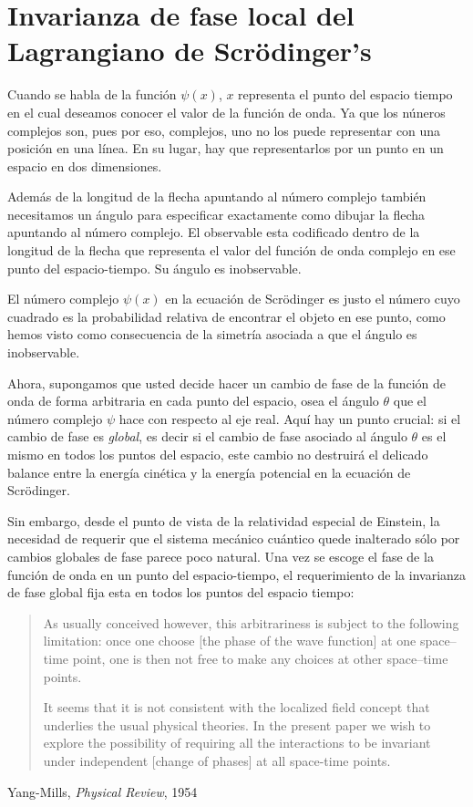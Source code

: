 \section{Invarianza de fase local del Lagrangiano de  Scrödinger's}

Cuando se habla de la función $\psi(x)$, $x$ representa el punto del espacio tiempo en el cual deseamos conocer el valor de la función de onda. 
Ya que los núneros complejos son, pues por eso, complejos, uno no los puede representar con una posición en una línea. En su lugar, hay que representarlos por un punto en un espacio en dos dimensiones.

Además de la longitud de la flecha apuntando al número complejo también necesitamos un ángulo para especificar exactamente como dibujar la flecha apuntando al número complejo. El observable esta codificado dentro de la longitud de la flecha que representa el valor del función de onda complejo en ese punto del espacio-tiempo. Su ángulo es inobservable.

El número complejo $\psi(x)$  en la ecuación de Scrödinger es justo el número cuyo cuadrado es la probabilidad relativa de encontrar el objeto en ese punto, como hemos visto como consecuencia de la simetría asociada a que el ángulo es inobservable.

Ahora, supongamos que usted decide hacer un cambio de fase de la función de onda de forma arbitraria en cada punto del espacio, osea el ángulo $\theta$ que el número complejo $\psi$ hace con respecto al eje real. Aquí hay un punto crucial: si el cambio de fase es \emph{global}, es decir si el cambio de fase asociado al ángulo $\theta$ es el mismo en todos los puntos del espacio, este cambio no destruirá el delicado balance entre la energía cinética y la energía potencial en la ecuación de Scrödinger.

Sin embargo, desde el punto de vista de la relatividad especial de Einstein, la necesidad de requerir que el sistema mecánico cuántico quede inalterado sólo por cambios globales de fase parece poco natural. Una vez se escoge el fase de la función de onda en un punto del espacio-tiempo, el requerimiento de la invarianza de fase global fija esta en todos los puntos del espacio tiempo: 

  \begin{quote}
\small
    As usually conceived however, this arbitrariness is subject to the following  limitation: once one choose [the phase of the wave function] at one space--time point, one is then not free to make any choices at other space--time points.

It seems that it is not consistent with the localized field concept that underlies the usual physical theories. In the present paper we wish to explore the possibility of requiring all the interactions to be invariant under independent [change of phases] at all space-time points.
  \end{quote}
  \begin{flushright}
    Yang-Mills, \emph{Physical Review}, 1954
  \end{flushright}

